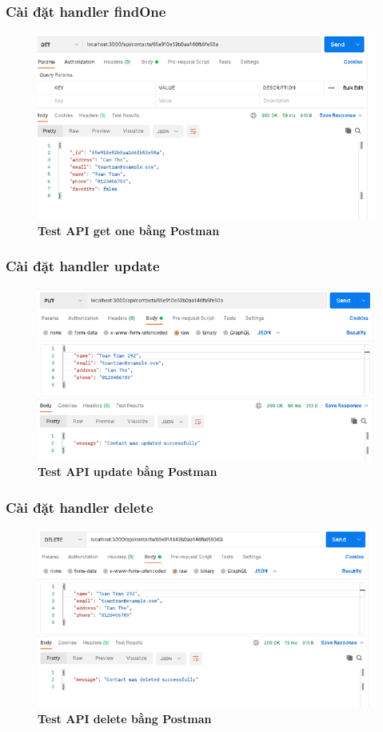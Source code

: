 \subsubsection*{Cài đặt handler findOne}
\begin{figure}[H]
  \centering
  \includegraphics[width=15cm]{images/chapterSecond/7.png}
  \caption{\bfseries Test API get one bằng Postman}
\end{figure}
\subsubsection*{Cài đặt handler update}
\begin{figure}[H]
  \centering
  \includegraphics[width=15cm]{images/chapterSecond/8.png}
  \caption{\bfseries Test API update bằng Postman}
\end{figure}
\subsubsection*{Cài đặt handler delete}
\begin{figure}[H]
  \centering
  \includegraphics[width=15cm]{images/chapterSecond/9.png}
  \caption{\bfseries Test API delete bằng Postman}
\end{figure}
